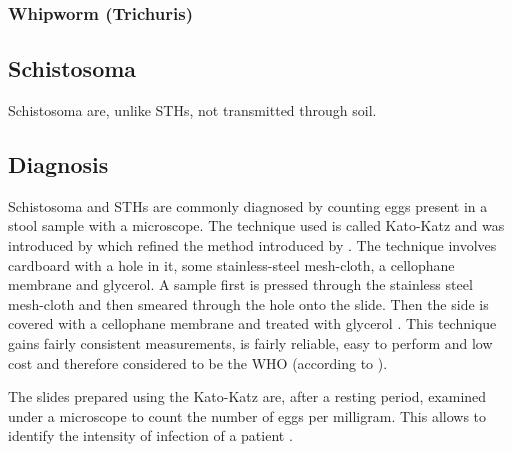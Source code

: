 \subsubsection{Whipworm (Trichuris)}
\label{sec:Foundations:NTDs:STHs:Whipworm}

\subsection{Schistosoma}
\label{sec:Foundations:NTDs:STHs:Schistosoma}

Schistosoma are, unlike \ac{STHs}, not transmitted through soil.  

\subsection{Diagnosis}
\label{sec:Foundations:NTDs:Diagnosis}

Schistosoma and \ac{STHs} are commonly diagnosed by counting eggs present in a stool sample with a microscope. The technique used is called Kato-Katz  and was introduced by \textcite{katz1972simple} which refined the method introduced by \citeauthor{kato1954comparative} \cite{kato1954comparative,kato1960correct}. The technique involves cardboard with a hole in it, some stainless-steel mesh-cloth, a cellophane membrane and glycerol. A sample first is pressed through the stainless steel mesh-cloth and then smeared through the hole onto the slide. Then the side is covered with a cellophane membrane and treated with glycerol \cite{mbongngwese2020diagnostic}. This technique gains fairly consistent measurements, is fairly reliable, easy to perform and low cost \cite{katz1972simple} and therefore considered to be the \ac{WHO}  (according to \textcite{mbongngwese2020diagnostic}).

The slides prepared using the Kato-Katz are, after a resting period, examined under a microscope to count the number of eggs per milligram. This allows to identify the intensity of infection of a patient \cite{feasey2010neglected}.  
